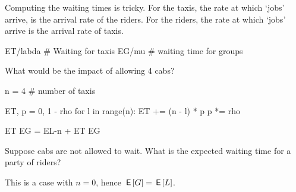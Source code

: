 \begin{exercise}[Hall 5.22]
\begin{solution}
Computing the waiting times is tricky. For the taxis, the rate at which `jobs' arrive, is the arrival rate of the riders. For the riders, the rate at which `jobs' arrive is the arrival rate of taxis.
\begin{pyconsole}
ET/labda # Waiting for taxis
EG/mu # waiting time for groups
\end{pyconsole}

What would be the impact of allowing 4 cabs?
\begin{pyconsole}
n = 4  # number of taxis

ET, p = 0, 1 - rho
for l in range(n):
    ET += (n - l) * p
    p *= rho

ET
EG = EL-n + ET
EG
\end{pyconsole}
\end{solution}
\end{exercise}


\begin{exercise}
Suppose cabs are not allowed to wait. What is the expected waiting time for a party of riders?

\begin{solution}
This is a case with $n=0$, hence $\,\mathsf{E}\left[G\right] = \,\mathsf{E}\left[L\right]$. 
\end{solution}
\end{exercise}


